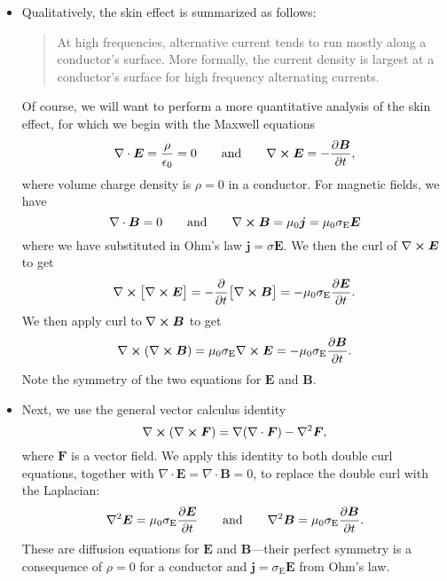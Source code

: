\documentclass[11pt, a4paper]{article}
\newcommand{\eqtext}[1]{\qquad \text{#1} \qquad}
\renewcommand{\vec}[1]{\bm{#1}} %
\newcommand{\E}{\vec{E}} %
\newcommand{\B}{\vec{B}} %
\newcommand{\ee}{\epsilon_{0}}  %
\newcommand{\mm}{\mu_{0}}  %
\renewcommand{\j}{\vec{j}}  %
\renewcommand{\div}{\nabla \cdot}
\renewcommand{\curl}{\nabla \cross}
\renewcommand{\grad}{\nabla}
\renewcommand{\laplacian}{\nabla^{2}}
\begin{document}
\begin{itemize}
	\item Qualitatively, the skin effect is summarized as follows:
    \begin{quote}
        At high frequencies, alternative current tends to run mostly along a conductor's surface. More formally, the current density is largest at a conductor's surface for high frequency alternating currents.
    \end{quote}
	Of course, we will want to perform a more quantitative analysis of the skin effect, for which we begin with the Maxwell equations
	\begin{equation*}
		\div \E = \frac{\rho}{\ee} = 0 \eqtext{and} \curl \E = - \pdv{\B}{t},
	\end{equation*}
	where volume charge density is $ \rho = 0 $ in a conductor. For magnetic fields, we have
	\begin{equation*}
		\div \B = 0 \eqtext{and} \curl \B = \mu_{0}\j = \mm \sigma_{\text{E}} \E
	\end{equation*}
	where we have substituted in Ohm's law $ \j = \sigma \E $. We then the curl of $ \curl \E $  to get
	\begin{equation*}
        \curl \big[ \curl \E \big] = - \pdv{t}\big[ \curl \B\big] = - \mm \sigma_{\text{E}} \pdv{\E}{t}.
	\end{equation*}
	We then apply curl to $ \curl \B $ to get
	\begin{equation*}
		\curl (\curl \B) = \mm \sigma_{\text{E}}\curl \E = - \mm \sigma_{\text{E}}\pdv{\B}{t}.
	\end{equation*}
	Note the symmetry of the two equations for $ \E $ and $ \B $.
	
	\item Next, we use the general vector calculus identity
	\begin{equation*}
		\curl (\curl \vec{F}) = \grad (\div \vec{F}) - \laplacian \vec{F},
	\end{equation*}
    where $ \vec{F} $ is a vector field. We apply this identity to both double curl equations, together with $ \div \E = \div \B = 0 $, to replace the double curl with the Laplacian:
	\begin{equation*}
		\laplacian \E = \mm \sigma_{\text{E}}\pdv{\E}{t} \eqtext{and} \laplacian \B = \mm \sigma_{\text{E}} \pdv{\B}{t}.
	\end{equation*}
	These are diffusion equations for $ \E $ and $ \B $---their perfect symmetry is a consequence of $ \rho = 0 $ for a conductor and $ \j = \sigma_{\text{E}} \E $ from Ohm's law. 
	

\end{itemize}
\end{document}
